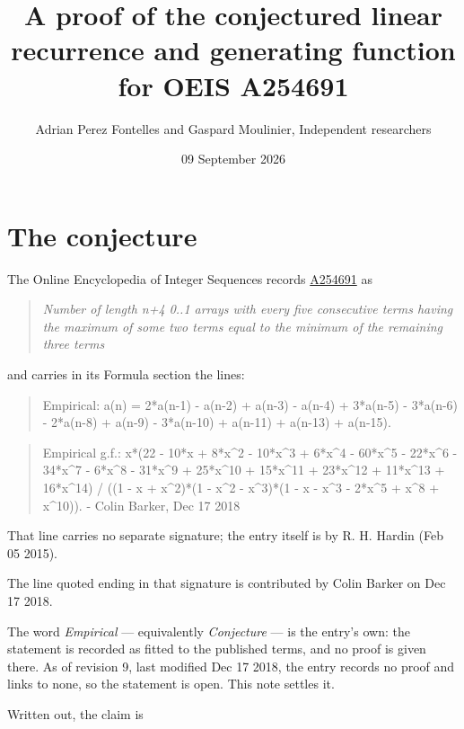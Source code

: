 \documentclass[11pt]{article}
\title{A proof of the conjectured linear recurrence and generating function for OEIS A254691}
\author{Adrian Perez Fontelles and Gaspard Moulinier, Independent researchers}
\date{09 September 2026}
\theoremstyle{definition}
\begin{document}
\maketitle
\section{The conjecture}

The Online Encyclopedia of Integer Sequences records \href{https://oeis.org/A254691}{A254691} as

\begin{quote}\itshape Number of length n+4 0..1 arrays with every five consecutive terms having the maximum of some two terms equal to the minimum of the remaining three terms\end{quote}

and carries in its Formula section the lines:

\begin{quote}\ttfamily Empirical: a(n) = 2*a(n-1) - a(n-2) + a(n-3) - a(n-4) + 3*a(n-5) - 3*a(n-6) - 2*a(n-8) + a(n-9) - 3*a(n-10) + a(n-11) + a(n-13) + a(n-15).\end{quote}

\begin{quote}\ttfamily Empirical g.f.: x*(22 - 10*x + 8*x\textasciicircum{}2 - 10*x\textasciicircum{}3 + 6*x\textasciicircum{}4 - 60*x\textasciicircum{}5 - 22*x\textasciicircum{}6 - 34*x\textasciicircum{}7 - 6*x\textasciicircum{}8 - 31*x\textasciicircum{}9 + 25*x\textasciicircum{}10 + 15*x\textasciicircum{}11 + 23*x\textasciicircum{}12 + 11*x\textasciicircum{}13 + 16*x\textasciicircum{}14) / ((1 - x + x\textasciicircum{}2)*(1 - x\textasciicircum{}2 - x\textasciicircum{}3)*(1 - x - x\textasciicircum{}3 - 2*x\textasciicircum{}5 + x\textasciicircum{}8 + x\textasciicircum{}10)). - Colin Barker, Dec 17 2018\end{quote}

That line carries no separate signature; the entry itself is by R. H. Hardin (Feb 05 2015).

The line quoted ending in that signature is contributed by Colin Barker on Dec 17 2018.

The word {\itshape Empirical} --- equivalently {\itshape Conjecture} --- is the entry's own: the statement is recorded as fitted to the published terms, and no proof is given there. As of revision 9, last modified Dec 17 2018, the entry records no proof and links to none, so the statement is open. This note settles it.

Written out, the claim is
\end{document}

